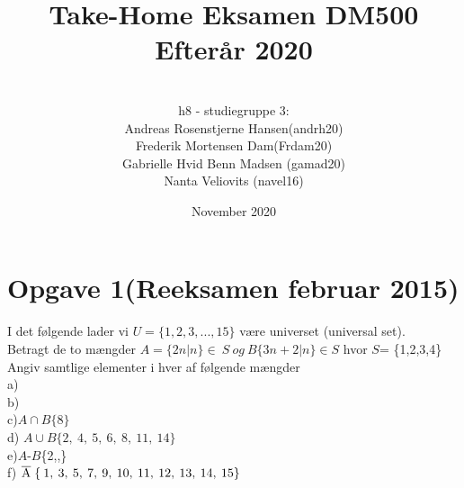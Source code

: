 \documentclass{article}
\title{Take-Home Eksamen DM500 Efterår 2020}
\author{
\\
h8 - studiegruppe 3:
\\
Andreas Rosenstjerne Hansen(andrh20)
\\
Frederik Mortensen Dam(Frdam20)
\\
Gabrielle Hvid Benn Madsen (gamad20)
\\
Nanta Veliovits (navel16)
\\
}
\date{November 2020}
\begin{document}
\maketitle
\pagebreak

\section{Opgave 1(Reeksamen februar 2015)}
I det følgende lader vi $U = \{ 1,2,3,...,15 \} $ være universet (universal set).
\\
Betragt de to mængder
\newline
\begin{math}
A = \{ 2n|n \} \in\: S\:og\: B \{ 3n + 2|n \} \in S
\end{math}
\newline hvor $S$= \{1,2,3,4\}
\\
\newline Angiv samtlige elementer i hver af følgende mængder
\\
\newline
a)
\\
\newline
b)
\\
\newline
c)\;$A \cap B \{ 8 \} $
\\
\newline
d)\; $A \cup B \{2,\:4,\:5,\:6,\:8,\:11,\:14\} $
\\
\newline
e)\;$A$\:-\:$B$\:\{2,,\}
\\
\newline
f)\; $\overline{\rm A}\;\{\:1,\:3,\:5,\:7,\:9,\:10,\:11,\:12,\:13,\:14,\:15\} $
\end{document}

